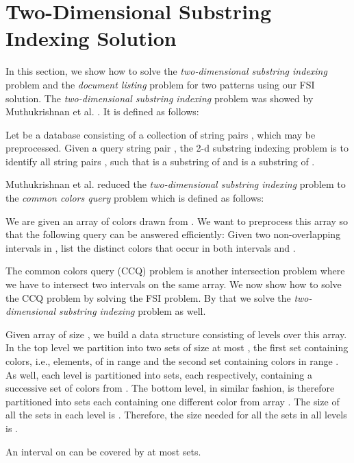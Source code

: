 \documentclass[10pt]{llncs}
\begin{document}
\section{Two-Dimensional Substring Indexing Solution}\label{sec:Two-Dimensional Substring Indexing Solution}
In this section,
we show how to solve the \emph{two-dimensional substring indexing} problem
and the \emph{document listing} problem for two patterns
using our FSI solution.
The \emph{two-dimensional substring indexing} problem was showed by Muthukrishnan et al. \cite{Muthu01}.
It is defined as follows:

\begin{definition}
Let  be a database consisting of a collection of string pairs
, which may be preprocessed.
Given a query string pair ,
the 2-d substring indexing problem is to identify all string pairs ,
such that  is a substring of  and  is a substring of .
\end{definition}

Muthukrishnan et al. \cite{Muthu01} reduced the \emph{two-dimensional substring indexing} problem
to the \emph{common colors query} problem which is defined as follows:

\begin{definition}
We are given an array  of colors drawn from .
We want to preprocess this array so that the following query can be answered efficiently:
Given two non-overlapping intervals  in ,
list the distinct colors that occur in both intervals  and .
\end{definition}

The common colors query (CCQ) problem is another intersection problem
where we have to intersect two intervals on the same array.
We now show how to solve the CCQ problem by solving the FSI problem.
By that we solve the \emph{two-dimensional substring indexing} problem as well.

Given array  of size ,
we build a data structure consisting of  levels over this array.
In the top level we partition  into two sets of size at most ,
the first set containing colors, i.e., elements, of  in range 
and the second set containing colors in range .
As well, each level  is partitioned into  sets,
each respectively, containing a successive set of  colors from .
The bottom level, in similar fashion,
is therefore partitioned into  sets each containing one different color from array .
The size of all the sets in each level is .
Therefore, the size needed for all the sets in all levels is .

\begin{lemma}\label{lem:IntervalCovering}
An interval  on  can be covered by at most  sets.
\end{lemma}
\end{document}
